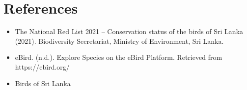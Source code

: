 \chapter{References}
\label{cp:References}

\begin{itemize}
    \item The National Red List 2021 – Conservation status of the birds of Sri Lanka (2021). Biodiversity Secretariat, Ministry of Environment, Sri Lanka.
    \\
    \item eBird. (n.d.). Explore Species on the eBird Platform. Retrieved from https://ebird.org/
    \\
    \item Birds of Sri Lanka
\end{itemize}
